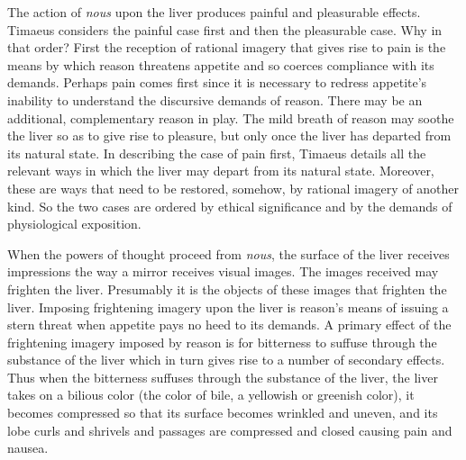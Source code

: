 The action of \emph{nous} upon the liver produces painful and pleasurable effects. Timaeus considers the painful case first and then the pleasurable case. Why in that order? First the reception of rational imagery that gives rise to pain is the means by which reason threatens appetite and so coerces compliance with its demands. Perhaps pain comes first since it is necessary to redress appetite's inability to understand the discursive demands of reason. There may be an additional, complementary reason in play. The mild breath of reason may soothe the liver so as to give rise to pleasure, but only once the liver has departed from its natural state. In describing the case of pain first, Timaeus details all the relevant ways in which the liver may depart from its natural state. Moreover, these are ways that need to be restored, somehow, by rational imagery of another kind. So the two cases are ordered by ethical significance and by the demands of physiological exposition.

When the powers of thought proceed from \emph{nous}, the surface of the liver receives impressions the way a mirror receives visual images. The images received may frighten the liver. Presumably it is the objects of these images that frighten the liver. Imposing frightening imagery upon the liver is reason's means of issuing a stern threat when appetite pays no heed to its demands. A primary effect of the frightening imagery imposed by reason is for bitterness to suffuse through the substance of the liver which in turn gives rise to a number of secondary effects. Thus when the bitterness suffuses through the substance of the liver, the liver takes on a bilious color (the color of bile, a yellowish or greenish color), it becomes compressed so that its surface becomes wrinkled and uneven, and its lobe curls and shrivels and passages are compressed and closed causing pain and nausea.

